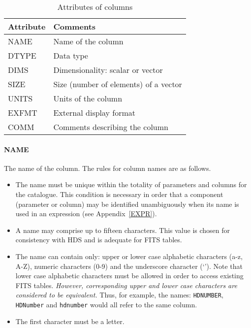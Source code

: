 \documentclass[twoside,11pt]{article}
\renewcommand{\_}{\texttt{\symbol{95}}}
\begin{document}
\begin{table}[htbp]

\begin{center}
\begin{tabular}{ll}
Attribute  & Comments                              \\ \hline
NAME       & Name of the column                    \\
DTYPE      & Data type                             \\
DIMS       & Dimensionality: scalar or vector      \\
SIZE       & Size (number of elements) of a vector \\
UNITS      & Units of the column                   \\
EXFMT      & External display format               \\
COMM       & Comments describing the column        \\
\end{tabular}
\end{center}

\caption{Attributes of columns\label{COLUMN_ATT} }

\end{table}

\paragraph{NAME}
The name of the column. The rules for column names are as follows.

\begin{itemize}

  \item The name must be unique within the totality of parameters and
   columns for the catalogue. This condition is necessary in order that
   a component (parameter or column) may be identified unambiguously
   when its name is used in an expression (see Appendix~\ref{EXPR}).

  \item A name may comprise up to fifteen characters. This value is chosen
   for consistency with HDS and is adequate for FITS tables.

  \item The name can contain only: upper or lower case alphabetic
   characters (a-z, A-Z), numeric characters (0-9) and the underscore
   character (`\_'). Note that lower case alphabetic characters must
   be allowed in order to access existing FITS tables. {\it However,
   corresponding upper and lower case characters are considered to be
   equivalent.} Thus, for example, the names: {\tt HD\_NUMBER}, {\tt
   HD\_Number} and {\tt hd\_number} would all refer to the same column.

  \item The first character must be a letter.

\end{itemize}
\end{document}
